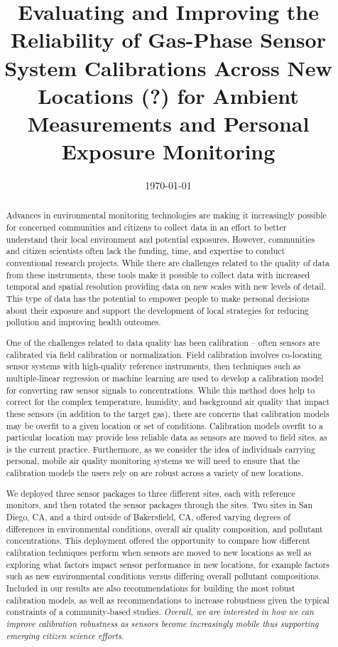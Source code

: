 \documentclass[journal abbreviation, manuscript]{copernicus}
\title{Evaluating and Improving the Reliability of Gas-Phase Sensor System Calibrations Across New Locations (?) for Ambient Measurements and Personal Exposure Monitoring}
\date{\today}
\affil[]{University of California, San Diego}
\affil[]{ADDRESS}
\begin{document}
\maketitle

\begin{abstract}

Advances in environmental monitoring technologies are making it increasingly possible for concerned communities and citizens to collect data in an effort to better understand their local environment and potential exposures. However, communities and citizen scientists often lack the funding, time, and expertise to conduct conventional research projects. While there are challenges related to the quality of data from these instruments, these tools make it possible to collect data with increased temporal and spatial resolution providing data on new scales with new levels of detail. This type of data has the potential to empower people to make personal decisions about their exposure and support the development of local strategies for reducing pollution and improving health outcomes.

One of the challenges related to data quality has been calibration – often sensors are calibrated via field calibration or normalization. Field calibration involves co-locating sensor systems with high-quality reference instruments, then techniques such as multiple-linear regression or machine learning are used to develop a calibration model for converting raw sensor signals to concentrations. While this method does help to correct for the complex temperature, humidity, and background air quality that impact these sensors (in addition to the target gas), there are concerns that calibration models may be overfit to a given location or set of conditions. Calibration models overfit to a particular location may provide less reliable data as sensors are moved to field sites, as is the current practice. Furthermore, as we consider the idea of individuals carrying personal, mobile air quality monitoring systems we will need to ensure that the calibration models the users rely on are robust across a variety of new locations.

We deployed three sensor packages to three different sites, each with reference monitors, and then rotated the sensor packages through the sites. Two sites in San Diego, CA, and a third outside of Bakersfield, CA, offered varying degrees of differences in environmental conditions, overall air quality composition, and pollutant concentrations. This deployment offered the opportunity to compare how different calibration techniques perform when sensors are moved to new locations as well as exploring what factors impact sensor performance in new locations, for example factors such as new environmental conditions versus differing overall pollutant compositions. Included in our results are also recommendations for building the most robust calibration models, as well as recommendations to increase robustness given the typical constraints of a community-based studies.  \emph{Overall, we are interested in how we can improve calibration robustness as sensors become increasingly mobile thus supporting emerging citizen science efforts.}

\end{abstract}
\end{document}
